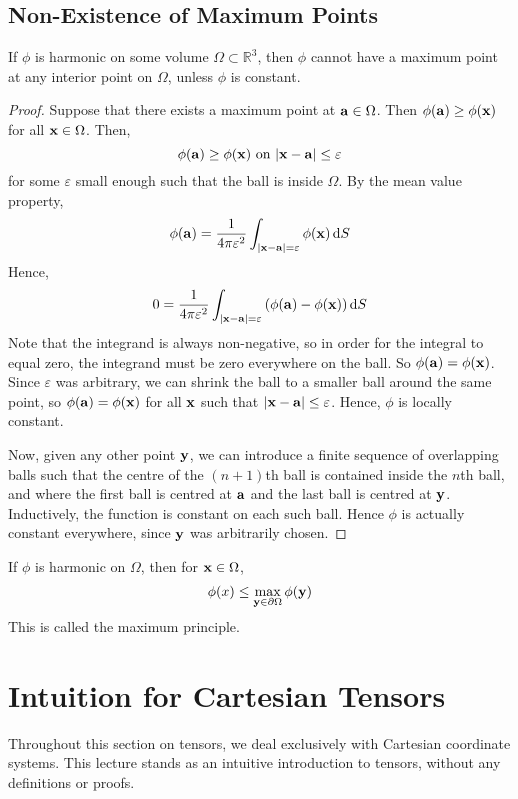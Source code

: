 \documentclass{article}
\begin{document}
\subsection{Non-Existence of Maximum Points}
\begin{proposition}
    If $\phi$ is harmonic on some volume $\Omega \subset \mathbb R^3$, then $\phi$ cannot have a maximum point at any interior point on $\Omega$, unless $\phi$ is constant.
\end{proposition}
\begin{proof}
    Suppose that there exists a maximum point at $\vb a \in \Omega$. Then $\phi(\vb a) \geq \phi(\vb x)$ for all $\vb x \in \Omega$. Then,
    \[ \phi(\vb a) \geq \phi(\vb x) \text{ on } \abs{\vb x - \vb a} \leq \varepsilon \]
    for some $\varepsilon$ small enough such that the ball is inside $\Omega$. By the mean value property,
    \[ \phi(\vb a) = \frac{1}{4\pi \varepsilon^2} \int_{\abs{\vb x - \vb a} = \varepsilon} \phi(\vb x) \dd{S} \]
    Hence,
    \[ 0 = \frac{1}{4\pi \varepsilon^2} \int_{\abs{\vb x - \vb a} = \varepsilon} \left( \phi(\vb a) - \phi(\vb x) \right) \dd{S} \]
    Note that the integrand is always non-negative, so in order for the integral to equal zero, the integrand must be zero everywhere on the ball. So $\phi(\vb a) = \phi(\vb x)$. Since $\varepsilon$ was arbitrary, we can shrink the ball to a smaller ball around the same point, so $\phi(\vb a) = \phi(\vb x)$ for all $\vb x$ such that $\abs{\vb x - \vb a} \leq \varepsilon$. Hence, $\phi$ is locally constant.

    Now, given any other point $\vb y$, we can introduce a finite sequence of overlapping balls such that the centre of the $(n+1)$th ball is contained inside the $n$th ball, and where the first ball is centred at $\vb a$ and the last ball is centred at $\vb y$. Inductively, the function is constant on each such ball. Hence $\phi$ is actually constant everywhere, since $\vb y$ was arbitrarily chosen.
\end{proof}
\begin{corollary}
    If $\phi$ is harmonic on $\Omega$, then for $\vb x \in \Omega$,
    \[ \phi(x) \leq \max_{\vb y \in \partial \Omega} \phi(\vb y) \]
    This is called the maximum principle.
\end{corollary}

\section{Intuition for Cartesian Tensors}
Throughout this section on tensors, we deal exclusively with Cartesian coordinate systems. This lecture stands as an intuitive introduction to tensors, without any definitions or proofs.
\end{document}

